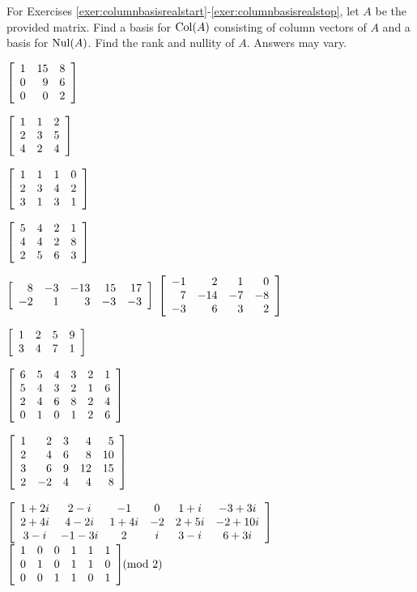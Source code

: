 \noindent For Exercises \ref{exer:columnbasisrealstart}-\ref{exer:columnbasisrealstop}, let $A$ be the provided matrix. Find a basis for $\col(A)$ consisting of column vectors of $A$ and a basis for $\nul(A)$. Find the rank and nullity of $A$. Answers may vary. 
\begin{enumerate}[!HW!]
\begin{multicols}{4}
\item \label{exer:columnbasisrealstart} $\mtx{rrr}{1&15&8\\0&9&6\\0&0&2}$ %
\item $\mtx{rrr}{1&1&2\\2&3&5\\4&2&4}$ %
\item $\mtx{rrrr}{1&1&1&0\\2&3&4&2\\3&1&3&1}$ %
\item $\mtx{rrrr}{5&4&2&1\\4&4&2&8\\2&5&6&3}$ %
\end{multicols}
\begin{multicols}{3}
\itemspade $\mtx{rrrrr}{8&-3&-13&15&17\\-2&1&3&-3&-3}$ 
\itemspade $\mtx{rrrr}{-1&2&1&0\\7&-14&-7&-8\\-3&6&3&2}$
\item $\mtx{rrrr}{1&2&5&9\\3&4&7&1}$ %
\end{multicols}
\begin{multicols}{3}
\item $\mtx{rrrrrr}{6&5&4&3&2&1\\5&4&3&2&1&6\\2&4&6&8&2&4\\0&1&0&1&2&6}$ %
\item $\mtx{rrrrr}{1&2&3&4&5\\2&4&6&8&10\\3&6&9&12&15\\2&-2&4&4&8}$ %
\end{multicols}
\begin{multicols}{3}
\itemspade $\mtx{cccccc}{1+2i&2-i&-1&0&1+i&-3+3i\\2+4i&4-2i&1+4i&-2&2+5i&-2+10i\\3-i&-1-3i&2&i&3-i&6+3i}$ \columnbreak
\phantom{blank}\columnbreak
\itemspade
\mbox{$\mtx{rrrrrr}{1&0&0&1&1&1\\0&1&0&1&1&0\\0&0&1&1&0&1}\hspace{-7pt} \pmod 2$}

\end{multicols}
\end{enumerate}
